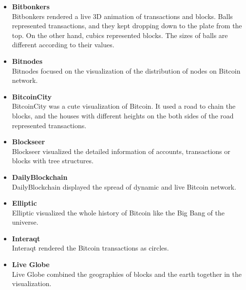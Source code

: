 \begin{itemize}
    \item \textbf{Bitbonkers} \cite{bitbonkers} \\
        Bitbonkers rendered a live 3D animation of transactions and blocks. Balls represented transactions, and they kept dropping down to the plate from the top. On the other hand, cubics represented blocks. The sizes of balls are different according to their values.
    \item \textbf{Bitnodes} \cite{bitnodes} \\
        Bitnodes focused on the visualization of the distribution of nodes on Bitcoin network.
    \item \textbf{BitcoinCity} \cite{bitcoincity} \\
        BitcoinCity was a cute visualization of Bitcoin. It used a road to chain the blocks, and the houses with different heights on the both sides of the road represented transactions.
    \item \textbf{Blockseer} \cite{blockseer} \\
        Blockseer visualized the detailed information of accounts, transactions or blocks with tree structures. 
    \item \textbf{DailyBlockchain} \cite{dailyblockchain} \\
        DailyBlockchain  displayed the spread of dynamic and live Bitcoin network.
    \item \textbf{Elliptic} \cite{elliptic} \\
        Elliptic visualized the whole history of Bitcoin like the Big Bang of the universe. 
    \item \textbf{Interaqt} \cite{interaqt} \\
        Interaqt rendered the Bitcoin transactions as circles.
    \item \textbf{Live Globe} \cite{liveglobe} \\
        Live Globe combined the geographies of blocks and the earth together in the visualization.
\end{itemize}


